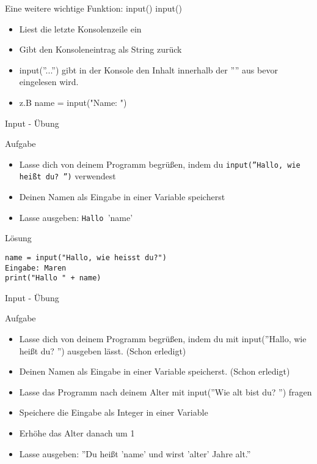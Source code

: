 \begin{frame}[fragile]{Eine weitere wichtige Funktion: input()}
input()
\begin{itemize}
\item Liest die letzte Konsolenzeile ein
\item Gibt den Konsoleneintrag als String zurück
\item input(''...'') gibt in der Konsole den Inhalt innerhalb der '''' aus bevor eingelesen wird.
\item z.B name = input("Name: ") 
\end{itemize}
\end{frame}

\begin{frame}[fragile]{Input - Übung}   
\begin{block}{Aufgabe}
\begin{itemize}


\item Lasse dich von deinem Programm begrüßen, indem du
  \texttt{input(''Hallo, wie heißt du? '')} verwendest
\item Deinen Namen als Eingabe in einer Variable speicherst 
\item Lasse ausgeben: \texttt{Hallo }'name'
\end{itemize}
\end{block}
\pause{}
\begin{exampleblock}{Lösung}
\begin{lstlisting}
name = input("Hallo, wie heisst du?")
Eingabe: Maren
print("Hallo " + name)
\end{lstlisting}
\end{exampleblock}
\end{frame}

\begin{frame}[fragile]{Input - Übung}   
\begin{block}{Aufgabe}
	\begin{itemize}
		\item Lasse dich von deinem Programm begrüßen, indem du mit input(''Hallo, wie heißt du? '') ausgeben lässt. (Schon erledigt)
		\item Deinen Namen als Eingabe in einer Variable speicherst. (Schon erledigt)
		\item Lasse das Programm nach deinem Alter mit input(''Wie alt bist du? '') fragen
		\item Speichere die Eingabe als Integer in einer Variable 
		\item Erhöhe das Alter danach um 1
		\item Lasse ausgeben: ''Du heißt 'name' und wirst 'alter' Jahre alt.''
	\end{itemize}
\end{block}
\end{frame}

